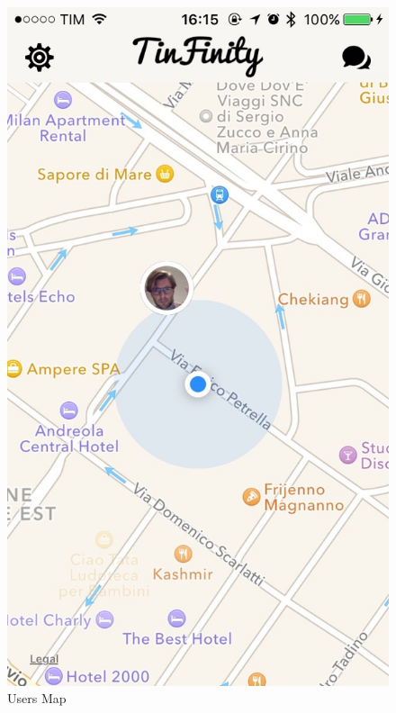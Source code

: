 \begin{multicols}{2}
\begin{figure}[H]
\centering
\centering
\includegraphics[scale=0.15]{./images/map.jpg}
\caption{\label{Users Map}Users Map}
\end{figure}


\end{multicols}
